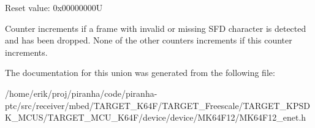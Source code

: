 Reset value\+: 0x00000000U

Counter increments if a frame with invalid or missing S\+FD character is detected and has been dropped. None of the other counters increments if this counter increments. 

The documentation for this union was generated from the following file\+:\begin{DoxyCompactItemize}
\item 
/home/erik/proj/piranha/code/piranha-\/ptc/src/receiver/mbed/\+T\+A\+R\+G\+E\+T\+\_\+\+K64\+F/\+T\+A\+R\+G\+E\+T\+\_\+\+Freescale/\+T\+A\+R\+G\+E\+T\+\_\+\+K\+P\+S\+D\+K\+\_\+\+M\+C\+U\+S/\+T\+A\+R\+G\+E\+T\+\_\+\+M\+C\+U\+\_\+\+K64\+F/device/device/\+M\+K64\+F12/M\+K64\+F12\+\_\+enet.\+h\end{DoxyCompactItemize}
